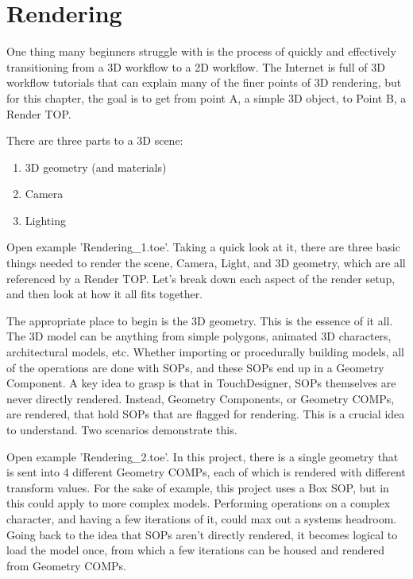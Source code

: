 
\section{Rendering}

\begin{fullwidth}

One thing many beginners struggle with is the process of quickly and effectively transitioning from a 3D workflow to a 2D workflow. The Internet is full of 3D workflow tutorials that can explain many of the finer points of 3D rendering, but for this chapter, the goal is to get from point A, a simple 3D object, to Point B, a Render TOP.

There are three parts to a 3D scene:

\begin{enumerate}
\item 3D geometry (and materials)
\item Camera
\item Lighting
\end{enumerate}

Open example 'Rendering\_1.toe'. Taking a quick look at it, there are three basic things needed to render the scene, Camera, Light, and 3D geometry, which are all referenced by a Render TOP. Let's break down each aspect of the render setup, and then look at how it all fits together.

The appropriate place to begin is the 3D geometry. This is the essence of it all. The 3D model can be anything from simple polygons, animated 3D characters, architectural models, etc. Whether importing or procedurally building models, all of the operations are done with SOPs, and these SOPs end up in a Geometry Component. A key idea to grasp is that in TouchDesigner, SOPs themselves are never directly rendered. Instead, Geometry Components, or Geometry COMPs, are rendered, that hold SOPs that are flagged for rendering. This is a crucial idea to understand. Two scenarios demonstrate this.

Open example 'Rendering\_2.toe'. In this project, there is a single geometry that is sent into 4 different Geometry COMPs, each of which is rendered with different transform values. For the sake of example, this project uses a Box SOP, but in this could apply to more complex models. Performing operations on a complex character, and having a few iterations of it, could max out a systems headroom. Going back to the idea that SOPs aren't directly rendered, it becomes logical to load the model once, from which a few iterations can be housed and rendered from Geometry COMPs.


\end{fullwidth}
